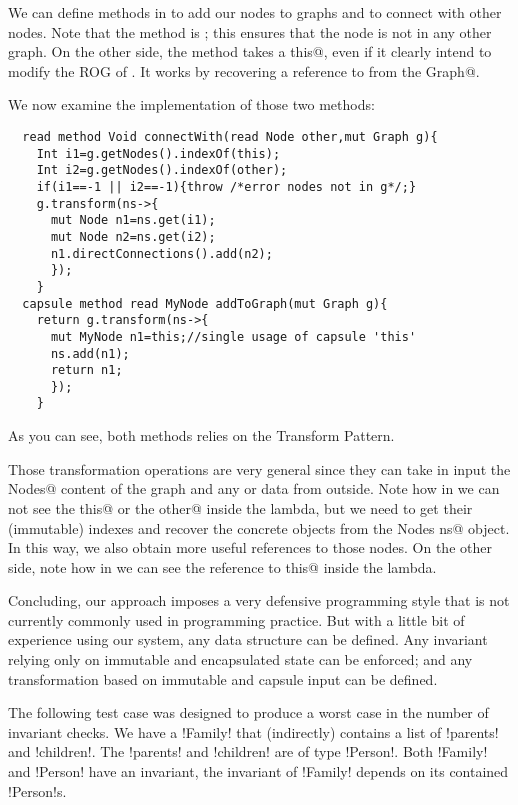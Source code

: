 We can define methods in \Q@MyNode@ to add our nodes
to graphs and to connect with other nodes.
Note that the method \Q@addToGraph@ is \Q@capsule@; this ensures that the node is not in any other graph.
On the other side, the method \Q@connectWith@ takes a \Q@read this@, even if it clearly intend to modify the ROG of \Q@this@.
It works by recovering a \Q@mut@ reference to \Q@this@ from the \Q@mut Graph@.

We now examine the implementation of those two methods:
\begin{lstlisting}
  read method Void connectWith(read Node other,mut Graph g){
    Int i1=g.getNodes().indexOf(this);
    Int i2=g.getNodes().indexOf(other);
    if(i1==-1 || i2==-1){throw /*error nodes not in g*/;}
    g.transform(ns->{
      mut Node n1=ns.get(i1);
      mut Node n2=ns.get(i2);
      n1.directConnections().add(n2);
      });
    }
  capsule method read MyNode addToGraph(mut Graph g){
    return g.transform(ns->{
      mut MyNode n1=this;//single usage of capsule 'this'
      ns.add(n1);
      return n1;
      });
    }
\end{lstlisting}
As you can see, both methods relies on the Transform Pattern.

Those transformation operations are very general since they
can take in input the \Q@mut Nodes@ content of the graph and 
any \Q@capsule@ or \Q@imm@ data from outside.
Note how in \Q@connectWith@ we can not see the \Q@read this@ or the \Q@read other@
inside the lambda, but we need to get their (immutable) indexes 
and recover the concrete objects from the \Q@mut Nodes ns@ object.
In this way, we also obtain more useful \Q@mut@ references to those nodes.
On the other side, note how in \Q@addToGraph@ we can see the reference to \Q@capsule this@ inside the lambda.

Concluding, our approach imposes a very defensive programming style
that is not currently commonly used in programming practice.
But with a little bit of experience using our system, any data structure can be defined.
Any invariant relying only on immutable and encapsulated state can be enforced; and any transformation based on immutable and capsule input can be defined.

The following test case was designed to produce a worst case in the number of invariant checks. We have a \Q!Family! that (indirectly) contains a list of \Q!parents! and \Q!children!. The \Q!parents! and \Q!children! are of type \Q!Person!. Both \Q!Family! and \Q!Person! have an invariant, the invariant of \Q!Family! depends on its contained \Q!Person!s.

